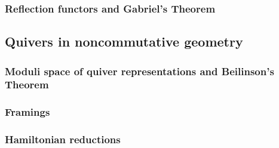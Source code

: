         \subsubsection{Reflection functors and Gabriel's Theorem}
        
    \subsection{Quivers in noncommutative geometry}
        \subsubsection{Moduli space of quiver representations and Beilinson's Theorem}
        
        \subsubsection{Framings}
        
        \subsubsection{Hamiltonian reductions}